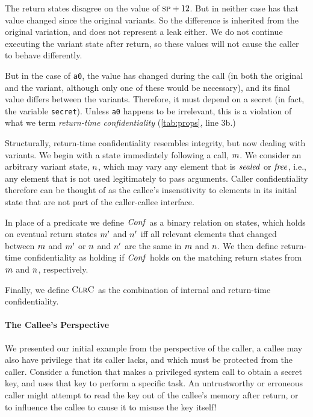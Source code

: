 \documentclass[10pt,conference]{ieeetran}%
\theoremstyle{definition}
\begin{document}
The return states disagree on the value of \(\textsc{sp} + 12\). But in neither
case has that value changed since the original variants. So the difference is inherited from
the original variation, and does not represent a leak either. We do not continue executing the
variant state after return, so these values will not cause the caller to behave differently.

But in the case of {\tt a0}, the value has changed during the call (in both the original
and the variant, although only one of these would be necessary), and its final value
differs between the variants.
Therefore, it must depend on a secret (in fact, the variable {\tt secret}).
Unless {\tt a0} happens to be irrelevant, this is a violation of what
we term {\it return-time confidentiality} (\cref{tab:props}, line 3b.)

Structurally, return-time confidentiality resembles integrity, but now dealing with
variants. We begin with a state immediately following
a call, \(m\). We consider an arbitrary variant state,
\(n\), which may vary any element that is \(\mathit{sealed}\) or \(\mathit{free}\),
i.e., any element that is not used legitimately to pass arguments. Caller confidentiality
therefore can be thought of as the callee's insensitivity to elements in its initial state
that are not part of the caller-callee interface.

In place of a predicate we define \(\mathit{Conf}\) as a binary relation on states,
which holds on eventual return states \(m'\) and \(n'\)
iff all relevant elements that changed between \(m\) and \(m'\) or \(n\) and \(n'\)
are the same in \(m\) and \(n\). We then define
return-time confidentiality as holding if \(\mathit{Conf}\) holds on the matching return states
from \(m\) and \(n\), respectively.

Finally, we define \(\textnormal{\sc ClrC}\) as the
combination of internal and return-time confidentiality.

\paragraph*{The Callee's Perspective}

We presented our initial example from the perspective of the caller, a callee
may also have privilege that its caller lacks, and which must be protected from the
caller. Consider a function that makes a privileged system call to obtain a secret key,
and uses that key to perform a specific task. An untrustworthy or erroneous caller might
attempt to read the key out of the callee's memory after return, or to influence the callee
to cause it to misuse the key itself!
\end{document}
